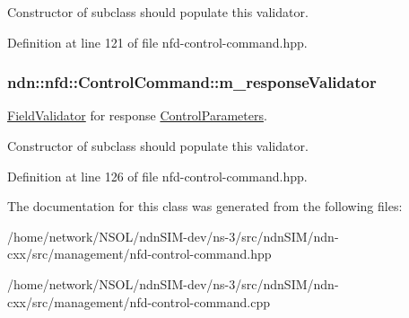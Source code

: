 Constructor of subclass should populate this validator. 

Definition at line 121 of file nfd-\/control-\/command.\+hpp.

\subsubsection[{\texorpdfstring{m\+\_\+response\+Validator}{m\_responseValidator}}]{ ndn\+::nfd\+::\+Control\+Command\+::m\+\_\+response\+Validator\hspace{0.3cm}{\ttfamily [protected]}}\hypertarget{classndn_1_1nfd_1_1ControlCommand_ae8a955d269aef120eb407f9354ce9dbe}{}\label{classndn_1_1nfd_1_1ControlCommand_ae8a955d269aef120eb407f9354ce9dbe}


\hyperlink{classndn_1_1nfd_1_1ControlCommand_1_1FieldValidator}{Field\+Validator} for response \hyperlink{classndn_1_1nfd_1_1ControlParameters}{Control\+Parameters}. 

Constructor of subclass should populate this validator. 

Definition at line 126 of file nfd-\/control-\/command.\+hpp.



The documentation for this class was generated from the following files\+:\begin{DoxyCompactItemize}
\item 
/home/network/\+N\+S\+O\+L/ndn\+S\+I\+M-\/dev/ns-\/3/src/ndn\+S\+I\+M/ndn-\/cxx/src/management/nfd-\/control-\/command.\+hpp\item 
/home/network/\+N\+S\+O\+L/ndn\+S\+I\+M-\/dev/ns-\/3/src/ndn\+S\+I\+M/ndn-\/cxx/src/management/nfd-\/control-\/command.\+cpp\end{DoxyCompactItemize}
